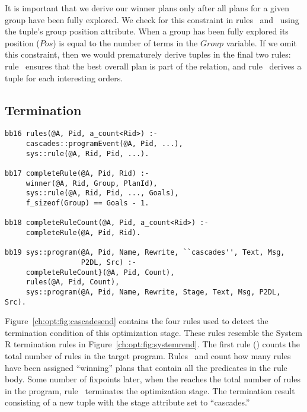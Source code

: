 It is important that we derive our winner plans only after all plans for a
given group have been fully explored.  We check for this constraint in
rules~ and~ using the  tuple's group position
attribute.  When a group has been fully explored its  position
($Pos$) is equal to the number of terms in the $Group$ variable.  If we omit
this constraint, then we would prematurely derive  tuples in the
final two rules: rule~ ensures that the best overall plan is part of
the  relation, and rule~ derives a  tuple for
each interesting orders.

\subsection{Termination}
\label{ch:opt:sec:cascadesend}

\begin{figure*}
\ssp
\centering
\begin{lstlisting}
bb16 rules(@A, Pid, a_count<Rid>) :-
     cascades::programEvent(@A, Pid, ...),
     sys::rule(@A, Rid, Pid, ...).

bb17 completeRule(@A, Pid, Rid) :-
     winner(@A, Rid, Group, PlanId),
     sys::rule(@A, Rid, Pid, ..., Goals),
     f_sizeof(Group) == Goals - 1.

bb18 completeRuleCount(@A, Pid, a_count<Rid>) :-
     completeRule(@A, Pid, Rid).

bb19 sys::program(@A, Pid, Name, Rewrite, ``cascades'', Text, Msg, 
                  P2DL, Src) :-
     completeRuleCount}(@A, Pid, Count),
     rules(@A, Pid, Count),
     sys::program(@A, Pid, Name, Rewrite, Stage, Text, Msg, P2DL, Src).
\end{lstlisting}
\caption{\label{ch:opt:fig:cascadesend}Cascades termination rules.}
\end{figure*}

Figure~\ref{ch:opt:fig:cascadesend} contains the four rules used to detect the
termination condition of this optimization stage.  These rules resemble the
System R termination rules in Figure~\ref{ch:opt:fig:systemrend}.  The first
rule () counts the total number of rules in the target program.
Rules~ and  count how many rules have been assigned
``winning'' plans that contain all the predicates in the rule body.  Some
number of fixpoints later, when the  reaches the total
number of rules in the program, rule~ terminates the optimization
stage.  The termination result consisting of a new  tuple with the
stage attribute set to ``cascades.''


